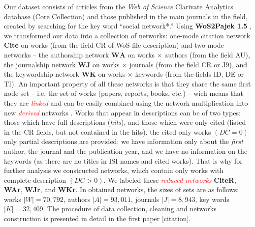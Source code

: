 \documentclass[11pt]{article} %
\newcommand{\keyw}[1]{\textcolor{red}{\emph{#1}}}
\newcommand{\WA}{\mathbf{W\!\!A}}
\newcommand{\WK}{\mathbf{W\!K}}
\newcommand{\WJ}{\mathbf{W\!J}}
\begin{document}
Our dataset consists of articles from the \textit{Web of Science} Clarivate Analytics database (Core Collection) and those published in the main journals in the field, created by searching for the key word “social network*.”  Using \textbf{WoS2Pajek 1.5} \citep{wos2pajek}, we transformed our data into a collection of networks: one-mode citation network \textbf{Cite} on works (from the field CR of WoS file description) and two-mode networks -- the authorship network $\WA$ on works $\times$ authors  (from the field AU),  the journalship network $\WJ$ on  works $\times$ journals  (from the field CR or J9), and the keywordship network $\WK$ on works  $\times$ keywords (from the fields ID, DE or TI). An important property of all these networks is that they share the same first node set -- i.e. the set of works (papers, reports, books, etc.) -- wich means that they are \keyw{linked} and can be easily combined using the network multiplication into new \keyw{derived}  networks \citep{Understand}. Works that appear in descriptions can be of two types: those which have full descriptions (\textit{hits}), and those which were only cited (listed in the CR fields, but not contained in the hits).  the cited only  works  $(DC=0)$ only partial descriptions are provided: we have information only about the \textit{first} author, the journal and the publication year, and we have no information on the keywords (as there are no titles in ISI names and cited works). That is why for further analysis we constructed networks, which contain only works with complete description $(DC>0)$. We labeled these \keyw{reduced networks} \textbf{CiteR}, \textbf{WAr}, \textbf{WJr}, and \textbf{WKr}. In obtained networks, the sizes of sets are as follows: works $|W| = 70,792$, authors $|A| = 93,011$, journals $|J| = 8,943$, key words $|K| = 32,409$. The procedure of data collection, cleaning and networks construction is presented in detail in the first paper [citation].\medskip 
\end{document}
